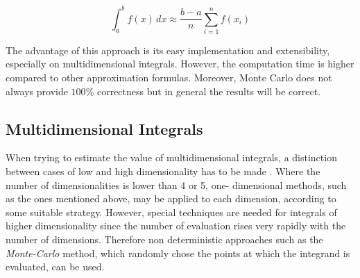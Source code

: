 \begin{equation}
\int_a^b f(x) \,dx \approx\frac {b-a}n \sum_{i=1}^n f(x_i)
\label{eq:montecarlo}
\end{equation}

The advantage of this approach is its easy implementation and extensibility, especially on multidimensional integrals. However, the computation time is higher compared to other approximation formulas. Moreover, Monte Carlo does not always provide $100\%$ correctness but in general the results will be correct. \cite{Robert2010, Judd2011}



\subsection{Multidimensional Integrals} 

When trying to estimate the value of multidimensional integrals, a distinction between cases of low and high dimensionality has to be made \cite{NAGlib}. Where the number of dimensionalities is lower than 4 or 5, one- dimensional methods, such as the ones mentioned above, may be applied to each dimension, according to some suitable strategy. However, special techniques are needed for integrals of higher dimensionality since the  number of evaluation rises very rapidly with the number of dimensions. Therefore non deterministic approaches such as the \emph{Monte-Carlo} method, which randomly chose the points at which the integrand is evaluated, can be used.